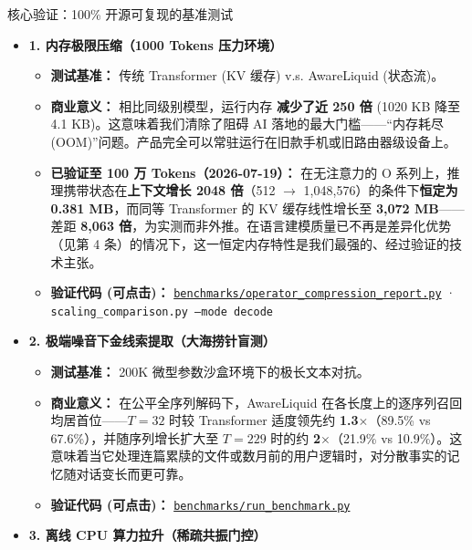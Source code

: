 ﻿\documentclass[aspectratio=169, 10pt]{beamer}
\begin{document}
\begin{frame}[allowframebreaks]{核心验证：100\% 开源可复现的基准测试}
\footnotesize
\begin{itemize}\itemsep=0.3em
    \item \textbf{1. 内存极限压缩（1000 Tokens 压力环境）}
    \begin{itemize}
        \item \textbf{测试基准：} 传统 Transformer (KV 缓存) v.s. AwareLiquid (状态流)。
        \item \textbf{商业意义：} 相比同级别模型，运行内存 \textbf{减少了近 250 倍} (1020 KB 降至 4.1 KB)。这意味着我们清除了阻碍 AI 落地的最大门槛——“内存耗尽(OOM)”问题。产品完全可以常驻运行在旧款手机或旧路由器级设备上。
        \item \textbf{已验证至 100 万 Tokens（2026-07-19）：} 在无注意力的 O 系列上，推理携带状态在\textbf{上下文增长 2048 倍}（512 $\to$ 1{,}048{,}576）的条件下\textbf{恒定为 0.381 MB}，而同等 Transformer 的 KV 缓存线性增长至 \textbf{3{,}072 MB}——差距 \textbf{8{,}063 倍}，为实测而非外推。在语言建模质量已不再是差异化优势（见第 4 条）的情况下，这一恒定内存特性是我们最强的、经过验证的技术主张。
        \item \textbf{验证代码 (可点击)：} \href{https://github.com/everest-an/M1/blob/main/benchmarks/operator_compression_report.py}{\texttt{benchmarks/operator\_compression\_report.py}} · \texttt{scaling\_comparison.py --mode decode}
    \end{itemize}
    \vspace{0.4em}
    \item \textbf{2. 极端噪音下金线索提取（大海捞针盲测）}
    \begin{itemize}
        \item \textbf{测试基准：} 200K 微型参数沙盒环境下的极长文本对抗。
        \item \textbf{商业意义：} 在公平全序列解码下，AwareLiquid 在各长度上的逐序列召回均居首位——$T=32$ 时较 Transformer 适度领先约 \textbf{1.3$\times$}（89.5\% vs 67.6\%），并随序列增长扩大至 $T=229$ 时的约 \textbf{2$\times$}（21.9\% vs 10.9\%）。这意味着当它处理连篇累牍的文件或数月前的用户逻辑时，对分散事实的记忆随对话变长而更可靠。
        \item \textbf{验证代码 (可点击)：} \href{https://github.com/everest-an/M1/blob/main/benchmarks/run_benchmark.py}{\texttt{benchmarks/run\_benchmark.py}}
    \end{itemize}
    \vspace{0.4em}
    \item \textbf{3. 离线 CPU 算力拉升（稀疏共振门控）}

\end{itemize}
\end{frame}
\end{document}
